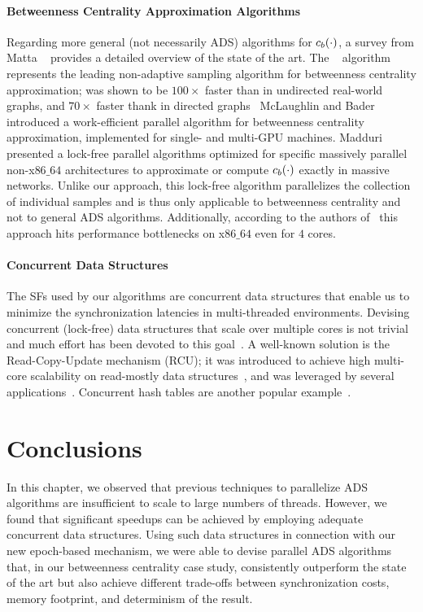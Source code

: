 \paragraph{Betweenness Centrality Approximation Algorithms}
%
Regarding more general (\ie not necessarily ADS) algorithms
for $c_b(\cdot)$, a survey from Matta \etal~\cite{matta2019comparing}
provides a detailed overview of the state of the art.
The \rk~\cite{DBLP:journals/datamine/RiondatoK16} algorithm represents the
leading non-adaptive sampling algorithm for betweenness centrality approximation;
\kadabra was shown to be $100\times$ faster than \rk in undirected real-world
graphs, and $70\times$ faster thank \rk in directed graphs~\cite{DBLP:conf/esa/BorassiN16}
McLaughlin and Bader~\cite{DBLP:conf/sc/McLaughlinB14} introduced a work-efficient parallel
algorithm for betweenness centrality approximation, implemented for single- and multi-GPU
machines. Madduri \etal~\cite{DBLP:conf/ipps/MadduriEJBC09} presented a lock-free
parallel algorithms optimized for specific massively parallel non-x$86\_64$ architectures
to approximate or compute $c_b(\cdot)$ exactly in massive networks.
Unlike our approach, this lock-free algorithm parallelizes the collection of individual
samples and is thus only applicable to betweenness centrality and not to general
ADS algorithms. Additionally, according to the authors of~\cite{DBLP:conf/ipps/MadduriEJBC09}
this approach hits performance bottlenecks on x$86\_64$ even for $4$ cores.

\paragraph{Concurrent Data Structures}
%
The SFs used by our algorithms are concurrent data structures that enable us to minimize
the synchronization latencies in multi-threaded environments.
Devising concurrent (lock-free) data structures that scale over multiple cores is not
trivial and much effort has been devoted to this
goal~\cite{DBLP:conf/osdi/Boyd-WickizerCMPKMZ10,DBLP:journals/tpds/Michael04}.
A well-known solution is the Read-Copy-Update mechanism (RCU); it was introduced
to achieve high multi-core scalability on read-mostly data
structures~\cite{mckenney1998read}, and was leveraged by several
applications~\cite{DBLP:conf/podc/ArbelA14,DBLP:conf/asplos/ClementsKZ12}.
Concurrent hash tables are another popular example~\cite{DBLP:conf/sosp/DavidGT13}.

\section{Conclusions}
%
In this chapter, we observed that previous techniques to
parallelize ADS algorithms are insufficient to scale to large numbers of
threads. However, we found that significant speedups can be achieved by
employing adequate concurrent data structures. Using such data structures in
connection with our new epoch-based mechanism, we were able to devise parallel
ADS algorithms that, in our betweenness centrality case study, consistently
outperform the state of the art but also achieve different trade-offs between
synchronization costs, memory footprint, and determinism of the result.

